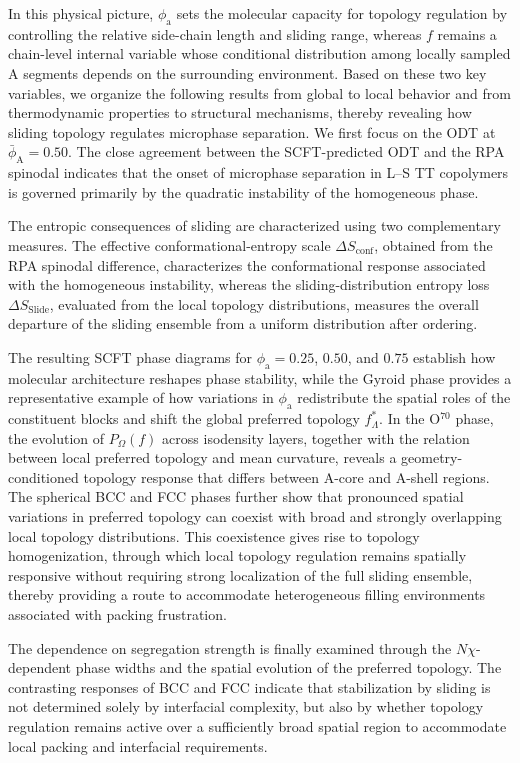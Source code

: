 In this physical picture, $\phi_{\mathrm a}$ sets the molecular capacity for topology regulation by controlling the relative side-chain length and sliding range, whereas $f$ remains a chain-level internal variable whose conditional distribution among locally sampled A segments depends on the surrounding environment.
Based on these two key variables, we organize the following results from global to local behavior and from thermodynamic properties to structural mechanisms, thereby revealing how sliding topology regulates microphase separation.
We first focus on the ODT at $\bar{\phi}_{\mathrm A}=0.50$.
The close agreement between the SCFT-predicted ODT and the RPA spinodal indicates that the onset of microphase separation in L--S TT copolymers is governed primarily by the quadratic instability of the homogeneous phase.

The entropic consequences of sliding are characterized using two complementary measures.
The effective conformational-entropy scale $\Delta S_{\mathrm{conf}}$, obtained from the RPA spinodal difference, characterizes the conformational response associated with the homogeneous instability, whereas the sliding-distribution entropy loss $\Delta S_{\mathrm{Slide}}$, evaluated from the local topology distributions, measures the overall departure of the sliding ensemble from a uniform distribution after ordering.

The resulting SCFT phase diagrams for $\phi_{\mathrm a}=0.25$, $0.50$, and $0.75$ establish how molecular architecture reshapes phase stability, while the Gyroid phase provides a representative example of how variations in $\phi_{\mathrm a}$ redistribute the spatial roles of the constituent blocks and shift the global preferred topology $f_{\Lambda}^{\ast}$.
In the O$^{70}$ phase, the evolution of $P_{\Omega}(f)$ across isodensity layers, together with the relation between local preferred topology and mean curvature, reveals a geometry-conditioned topology response that differs between A-core and A-shell regions.
The spherical BCC and FCC phases further show that pronounced spatial variations in preferred topology can coexist with broad and strongly overlapping local topology distributions.
This coexistence gives rise to topology homogenization, through which local topology regulation remains spatially responsive without requiring strong localization of the full sliding ensemble, thereby providing a route to accommodate heterogeneous filling environments associated with packing frustration.

The dependence on segregation strength is finally examined through the $N\chi$-dependent phase widths and the spatial evolution of the preferred topology.
The contrasting responses of BCC and FCC indicate that stabilization by sliding is not determined solely by interfacial complexity, but also by whether topology regulation remains active over a sufficiently broad spatial region to accommodate local packing and interfacial requirements.

